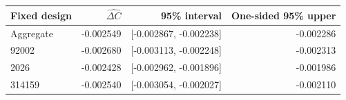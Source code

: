 \begin{tabular}{lrrr}
\toprule
Fixed design & $\widehat{\Delta C}$ & 95\% interval & One-sided 95\% upper \\
\midrule
Aggregate & -0.002549 & [-0.002867, -0.002238] & -0.002286 \\
92002 & -0.002680 & [-0.003113, -0.002248] & -0.002313 \\
2026 & -0.002428 & [-0.002962, -0.001896] & -0.001986 \\
314159 & -0.002540 & [-0.003054, -0.002027] & -0.002110 \\
\bottomrule
\end{tabular}

